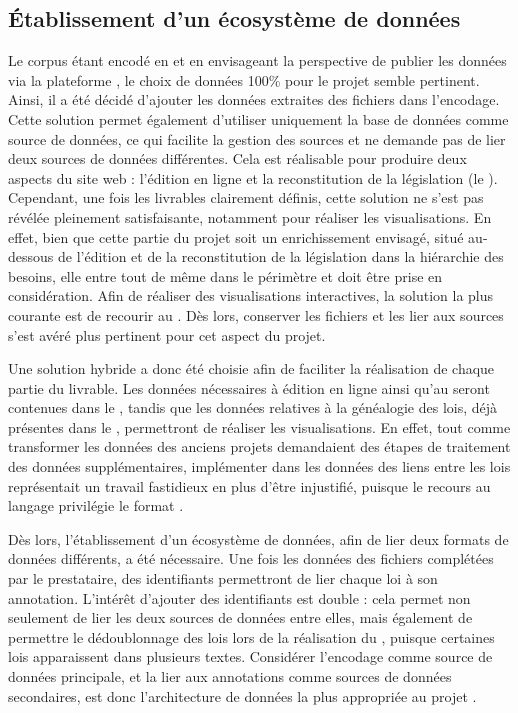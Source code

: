 \subsection{Établissement d’un écosystème de données}

Le corpus étant encodé en \XML et en envisageant la perspective de publier les données via la plateforme \tp, le choix de données 100\% \XML pour le projet semble pertinent. Ainsi, il a été décidé d'ajouter les données extraites des fichiers \JSON dans l'encodage. Cette solution permet également d'utiliser uniquement la base de données \XML comme source de données, ce qui facilite la gestion des sources et ne demande pas de lier deux sources de données différentes. Cela est réalisable pour produire deux aspects du site web : l'édition en ligne et la reconstitution de la législation (le \cv). Cependant, une fois les livrables clairement définis, cette solution ne s'est pas révélée pleinement satisfaisante, notamment pour réaliser les visualisations. En effet, bien que cette partie du projet soit un enrichissement envisagé, situé au-dessous de l'édition et de la reconstitution de la législation dans la hiérarchie des besoins, elle entre tout de même dans le périmètre et doit être prise en considération. Afin de réaliser des visualisations interactives, la solution la plus courante est de recourir au \JS. Dès lors, conserver les fichiers \JSON et les lier aux sources \XML s'est avéré plus pertinent pour cet aspect du projet. 

Une solution hybride a donc été choisie afin de faciliter la réalisation de chaque partie du livrable. Les données nécessaires à édition en ligne ainsi qu'au \cv seront contenues dans le \XML, tandis que les données relatives à la généalogie des lois, déjà présentes dans le \JSON, permettront de réaliser les visualisations. En effet, tout comme transformer les données des anciens projets demandaient des étapes de traitement des données supplémentaires, implémenter dans les données des liens entre les lois représentait un travail fastidieux en plus d'être injustifié, puisque le recours au langage \JS privilégie le format \JSON. 

Dès lors, l'établissement d'un écosystème de données, afin de lier deux formats de données différents, a été nécessaire. Une fois les données des fichiers \JSON complétées par le prestataire, des identifiants permettront de lier chaque loi à son annotation. L'intérêt d'ajouter des identifiants est double : cela permet non seulement de lier les deux sources de données entre elles, mais également de permettre le dédoublonnage des lois lors de la réalisation du \cv, puisque certaines lois apparaissent dans plusieurs textes. Considérer l'encodage \XML comme source de données principale, et la lier aux annotations comme sources de données secondaires, est donc l'architecture de données la plus appropriée au projet \COREL. 
